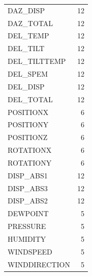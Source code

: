 \begin{table}[H]
\begin{tabular}{lr}
        DAZ\_DISP &                   12 \\
        DAZ\_TOTAL &                   12 \\
        DEL\_TEMP &                   12 \\
        DEL\_TILT &                   12 \\
        DEL\_TILTTEMP &                   12 \\
        DEL\_SPEM &                   12 \\
        DEL\_DISP &                   12 \\
        DEL\_TOTAL &                   12 \\
        POSITIONX &                    6 \\
        POSITIONY &                    6 \\
        POSITIONZ &                    6 \\
        ROTATIONX &                    6 \\
        ROTATIONY &                    6 \\
        DISP\_ABS1 &                   12 \\
        DISP\_ABS3 &                   12 \\
        DISP\_ABS2 &                   12 \\
        DEWPOINT &                    5 \\
        PRESSURE &                    5 \\
        HUMIDITY &                    5 \\
        WINDSPEED &                    5 \\
        WINDDIRECTION &                    5\\
        \bottomrule
    \end{tabular}
    \label{tab:data_frequency}
\end{table}


